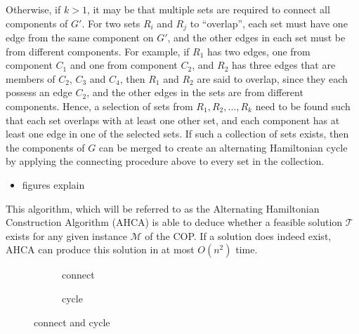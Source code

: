 \documentclass[oribibl]{llncs}
\begin{document}
Otherwise, if $k > 1$, it may be that multiple sets are required to connect all components of $G'$. For two sets $R_i$ and $R_j$ to ``overlap'', each set must have one edge from the same component on $G'$, and the other edges in each set must be from different components. For example, if $R_1$ has two edges, one from component $C_1$ and one from component $C_2$, and $R_2$ has three edges that are members of $C_2$, $C_3$ and $C_4$, then $R_1$ and $R_2$ are said to overlap, since they each possess an edge $C_2$, and the other edges in the sets are from different components. Hence, a selection of sets from $R_1, R_2, ..., R_k$ need to be found such that each set overlaps with at least one other set, and each component has at least one edge in one of the selected sets. If such a collection of sets exists, then the components of $G$ can be merged to create an alternating Hamiltonian cycle by applying the connecting procedure above to every set in the collection.

\begin{itemize}
	\item figures explain
\end{itemize}

This algorithm, which will be referred to as the Alternating Hamiltonian Construction Algorithm (AHCA) is able to deduce whether a feasible solution $\mathcal{T}$ exists for any given instance $\mathcal{M}$ of the COP. If a solution does indeed exist, AHCA can produce this solution in at most $O(n^2)$ time.

\begin{figure}	
	\centering
	\begin{subfigure}[H]{0.5\textwidth}
		
		\caption{connect}	
		\label{fig:mpsconnect}
	\end{subfigure} \quad
	\begin{subfigure}[H]{0.5\textwidth}
		
		\caption{cycle}	
		\label{fig:mpscycle}
	\end{subfigure}
	\caption{connect and cycle}
	\label{fig:connect/cycle}
\end{figure}
\end{document}
